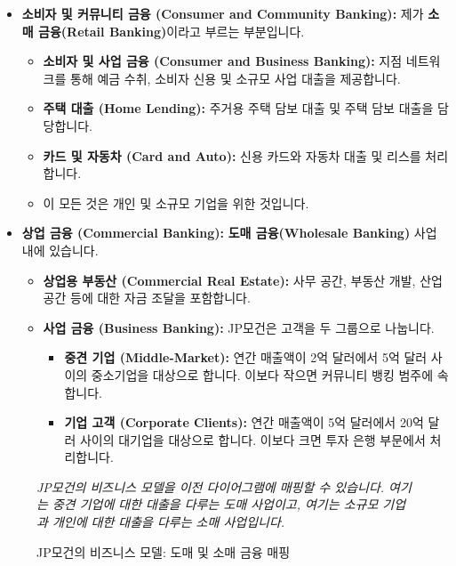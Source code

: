 \documentclass[11pt,a4paper]{book}
\theoremstyle{definition}
\begin{document}
\begin{itemize}
    \item \textbf{소비자 및 커뮤니티 금융 (Consumer and Community Banking):} 제가 \textbf{소매 금융(Retail Banking)}이라고 부르는 부분입니다.
    \begin{itemize}
        \item \textbf{소비자 및 사업 금융 (Consumer and Business Banking):} 지점 네트워크를 통해 예금 수취, 소비자 신용 및 소규모 사업 대출을 제공합니다.
        \item \textbf{주택 대출 (Home Lending):} 주거용 주택 담보 대출 및 주택 담보 대출을 담당합니다.
        \item \textbf{카드 및 자동차 (Card and Auto):} 신용 카드와 자동차 대출 및 리스를 처리합니다.
        \item 이 모든 것은 개인 및 소규모 기업을 위한 것입니다.
    \end{itemize}

    \item \textbf{상업 금융 (Commercial Banking):} \textbf{도매 금융(Wholesale Banking)} 사업 내에 있습니다.
    \begin{itemize}
        \item \textbf{상업용 부동산 (Commercial Real Estate):} 사무 공간, 부동산 개발, 산업 공간 등에 대한 자금 조달을 포함합니다.
        \item \textbf{사업 금융 (Business Banking):} JP모건은 고객을 두 그룹으로 나눕니다.
        \begin{itemize}
            \item \textbf{중견 기업 (Middle-Market):} 연간 매출액이 2억 달러에서 5억 달러 사이의 중소기업을 대상으로 합니다. 이보다 작으면 커뮤니티 뱅킹 범주에 속합니다.
            \item \textbf{기업 고객 (Corporate Clients):} 연간 매출액이 5억 달러에서 20억 달러 사이의 대기업을 대상으로 합니다. 이보다 크면 투자 은행 부문에서 처리합니다.
        \end{itemize}
    \end{itemize}
\end{itemize}

\begin{figure}[h!]
    \centering
    \caption{JP모건의 비즈니스 모델: 도매 및 소매 금융 매핑}
    \label{fig:jpmorgan_diagram}
    \textit{JP모건의 비즈니스 모델을 이전 다이어그램에 매핑할 수 있습니다. 여기는 중견 기업에 대한 대출을 다루는 도매 사업이고, 여기는 소규모 기업과 개인에 대한 대출을 다루는 소매 사업입니다.}
\end{figure}
\end{document}
